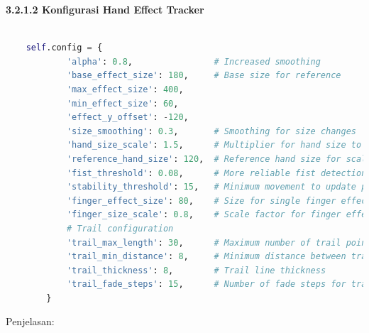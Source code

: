 \documentclass[11pt,a4paper]{article}
\begin{document}
    \noindent\textbf{3.2.1.2 Konfigurasi Hand Effect Tracker}
    \begin{lstlisting}[language=Python, caption=Konfigurasi Hand Effect Tracker]
    
    self.config = {
            'alpha': 0.8,                # Increased smoothing
            'base_effect_size': 180,     # Base size for reference
            'max_effect_size': 400,
            'min_effect_size': 60,
            'effect_y_offset': -120,
            'size_smoothing': 0.3,       # Smoothing for size changes
            'hand_size_scale': 1.5,      # Multiplier for hand size to effect size
            'reference_hand_size': 120,  # Reference hand size for scaling
            'fist_threshold': 0.08,      # More reliable fist detection
            'stability_threshold': 15,   # Minimum movement to update position
            'finger_effect_size': 80,    # Size for single finger effects
            'finger_size_scale': 0.8,    # Scale factor for finger effects
            # Trail configuration
            'trail_max_length': 30,      # Maximum number of trail points
            'trail_min_distance': 8,     # Minimum distance between trail points
            'trail_thickness': 8,        # Trail line thickness
            'trail_fade_steps': 15,      # Number of fade steps for trail
        }
    \end{lstlisting}
    Penjelasan:
\end{document}
